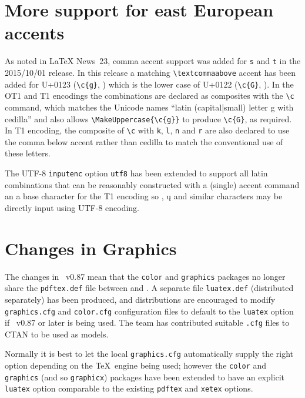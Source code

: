 \documentclass{ltnews}
\providecommand\pkg[1]{\texttt{#1}}
\providecommand\option[1]{\texttt{#1}}
\providecommand\file[1]{\texttt{#1}}
\begin{document}
\section{More support for east European accents}

As noted in \LaTeX{} News~23, comma accent support was added for \texttt{s} and
\texttt{t} in the 2015/10/01 release. In this release a matching
\verb|\textcommaabove| accent has been added for U+0123 (\verb|\c{g}|,
) which is the lower case of U+0122 (\verb|\c{G}|,
).  In the OT1 and T1 encodings the combinations are
declared as composites with the \verb|\c| command, which matches the
Unicode names ``\textsf{latin (capital|small) letter g with cedilla}'' and
also allows \verb|\MakeUppercase{\c{g}}| to produce \verb|\c{G}|, as
required.  In T1 encoding, the composite of \verb|\c| with \texttt{k}, \texttt{l},
\texttt{n} and \texttt{r} are also
declared to use the comma below accent rather than cedilla to match the
conventional use of these letters.

The UTF-8 \pkg{inputenc} option \option{utf8} has been extended to
support all latin combinations that can be reasonably constructed with a
(single) accent command an a base character for the T1 encoding so
, \k{u} and similar characters may be directly input
using UTF-8 encoding.

\section{Changes in Graphics}

The changes in ~v0.87 mean that the \pkg{color} and
\pkg{graphics} packages no longer share the \file{pdftex.def} file
between  and . A separate file
\file{luatex.def} (distributed separately) has been produced, and
distributions are encouraged to modify \file{graphics.cfg} and
\file{color.cfg} configuration files to default to the \option{luatex}
option if ~v0.87 or later is being used. The team has
contributed suitable \texttt{.cfg} files to CTAN to be used
as models.

Normally it is best to let the local \file{graphics.cfg}
automatically supply the right option depending on the \TeX\ engine
being used; however the \pkg{color} and \pkg{graphics} (and so
\pkg{graphicx}) packages have been extended to have an explicit
\option{luatex} option comparable to the existing \option{pdftex} and
\option{xetex} options.
\end{document}
